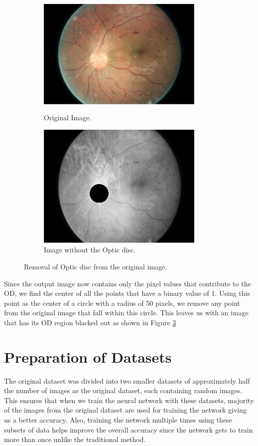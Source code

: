 \documentclass[12pt]{report}
\begin{document}
\begin{figure}[h]
\centering
\begin{subfigure}{.5\textwidth}
  \centering
  \includegraphics[width = 8cm, height =6cm]{Capture1}
  \caption{Original Image.}
  \label{fig:sub7}
\end{subfigure}%
\begin{subfigure}{.5\textwidth}
  \centering
  \includegraphics[width = 8cm, height =6cm]{Capture2}
  \caption{Image without the Optic disc.}
  \label{fig:sub8}
\end{subfigure}
\caption{Removal of Optic disc from the original image.}
\label{fig:test2}
\end{figure}

\noindent Since the output image now contains only the pixel values that contribute to the OD, we find the center of all the points that have a binary value of 1. Using this point as the center of a circle with a radius of 50 pixels, we remove any point from the original image that fall within this circle. This leaves us with an image that has its OD region blacked out as shown in Figure \ref{fig:test2}

\section{Preparation of Datasets}
The original dataset was divided into two smaller datasets of approximately half the number of images as the original dataset, each containing random images. This ensures that when we train the neural network with these datasets, majority of the images from the original dataset are used for training the network giving us a better accuracy. Also, training the network multiple times using these subsets of data helps improve the overall accuracy since the network gets to train more than once unlike the traditional method. 
\end{document}
